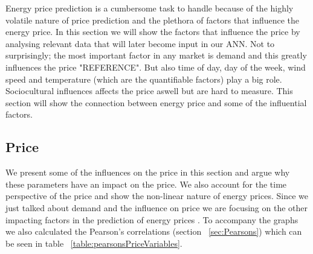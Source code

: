 Energy price prediction is a cumbersome task to handle because of the highly volatile nature of price prediction and the plethora of factors that influence the energy price. In this section we will show the factors that influence the price by analysing relevant data that will later become input in our ANN. Not to surprisingly; the most important factor in any market is demand and this greatly influences the price "REFERENCE". But also time of day, day of the week, wind speed and temperature (which are the quantifiable factors) play a big role. Sociocultural influences affects the price aswell but are hard to measure. This section will show the connection between energy price and some of the influential factors.



\subsection{Price}\label{sec:Price}
We present some of the influences on the price in this section and argue why these parameters have an impact on the price. We also account for the time perspective of the price and show the non-linear nature of energy prices. Since we just talked about demand and the influence on price we are focusing on the other impacting factors in the prediction of energy prices . To accompany the graphs we also calculated the Pearson's correlations (section ~\ref{sec:Pearsons}) which can be seen in table ~\ref{table:pearsonsPriceVariables}.

